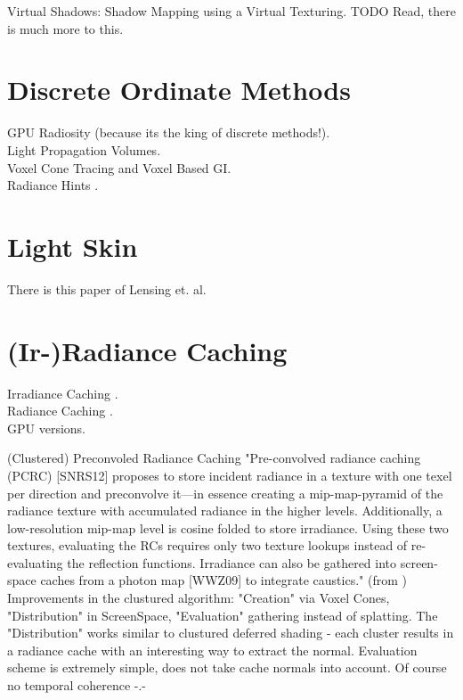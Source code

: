 \documentclass[thesis.tex]{subfiles}
\begin{document}
Virtual Shadows: Shadow Mapping using a Virtual Texturing. TODO Read, there is much more to this. \cite{bib:virtualshadowmaps}

\section{Discrete Ordinate Methods}
GPU Radiosity (because its the king of discrete methods!).\\
Light Propagation Volumes.\\
Voxel Cone Tracing and Voxel Based GI.\\
Radiance Hints \cite{bib:radiancehints}.

\section{Light Skin}
There is this paper \cite{bib:LightskinPaper} of Lensing et. al.

\section{(Ir-)Radiance Caching}
Irradiance Caching \cite{bib:irradiancecaching}.\\
Radiance Caching \cite{bib:radiancecaching}.\\
GPU versions.


(Clustered) Preconvoled Radiance Caching \cite{bib:clusteredpreconvoledradiancecaching}
"Pre-convolved radiance caching (PCRC) [SNRS12] proposes to store incident radiance in a texture with one texel per direction and preconvolve it—in essence creating a mip-map-pyramid of the
radiance texture with accumulated radiance in the higher
levels. Additionally, a low-resolution mip-map level is cosine folded to store irradiance. Using these two textures, evaluating the RCs requires only two texture lookups instead of re-evaluating the reflection functions. Irradiance can also be gathered into screen-space caches from a photon map [WWZ09] to integrate caustics." (from \cite{bib:clusteredpreconvoledradiancecaching})\\
Improvements in the clustured algorithm: "Creation" via Voxel Cones, "Distribution" in ScreenSpace, "Evaluation" gathering instead of splatting. The "Distribution" works similar to clustured deferred shading - each cluster results in a radiance cache with an interesting way to extract the normal. Evaluation scheme is extremely simple, does not take cache normals into account. Of course no temporal coherence -.-
\end{document}
